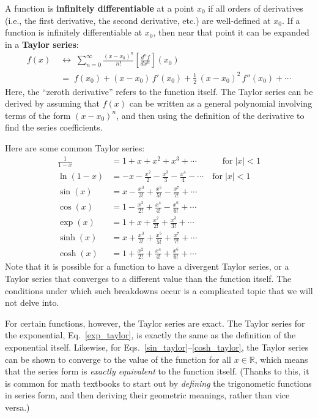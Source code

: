 \documentclass[10pt,a4paper]{article}
\begin{document}
A function is \textbf{infinitely differentiable} at a point $x_0$ if
all orders of derivatives (i.e., the first derivative, the second
derivative, etc.) are well-defined at $x_0$. If a function is
infinitely differentiable at $x_0$, then near that point it can be
expanded in a \textbf{Taylor series}:
\begin{align}
  f(x) \;&\leftrightarrow\; \sum_{n=0}^\infty \frac{(x-x_0)^n}{n!} \left[\frac{d^nf}{dx^n}\right](x_0) \\
  &=\; f(x_0) + (x-x_0)\, f'(x_0) + \frac{1}{2}\, (x-x_0)^2\, f''(x_0) + \cdots
\end{align}
Here, the ``zeroth derivative'' refers to the function itself. The
Taylor series can be derived by assuming that $f(x)$ can be written as
a general polynomial involving terms of the form $(x-x_0)^n$, and then
using the definition of the derivative to find the series
coefficients.

Here are some common Taylor series:
\begin{align}
  \frac{1}{1-x} &= 1 + x + x^2 + x^3 + \cdots
  \qquad\quad \mathrm{for} \; |x| < 1  \\
  \ln(1-x) &= -x - \frac{x^2}{2} - \frac{x^3}{3} - \frac{x^4}{4} - \cdots \quad \mathrm{for} \; |x| < 1 \\
  \sin(x) &= x - \frac{x^3}{3!} + \frac{x^5}{5!} - \frac{x^7}{7!} + \cdots
  \label{sin_taylor} \\
  \cos(x) &= 1 - \frac{x^2}{2!} + \frac{x^4}{4!} - \frac{x^6}{6!} + \cdots
  \label{cos_taylor} \\
  \exp(x) &= 1 + x + \frac{x^2}{2!} + \frac{x^3}{3!} + \cdots
  \label{exp_taylor} \\
  \sinh(x) &= x + \frac{x^3}{3!} + \frac{x^5}{5!} + \frac{x^7}{7!} + \cdots \\
  \cosh(x) &= 1 + \frac{x^2}{2!} + \frac{x^4}{4!} + \frac{x^6}{6!} + \cdots
  \label{cosh_taylor}
\end{align}
Note that it is possible for a function to have a divergent Taylor
series, or a Taylor series that converges to a different value than
the function itself. The conditions under which such breakdowns occur
is a complicated topic that we will not delve into.

For certain functions, however, the Taylor series are exact. The
Taylor series for the exponential, Eq.~\eqref{exp_taylor}, is exactly
the same as the definition of the exponential itself. Likewise, for
Eqs.~\eqref{sin_taylor}--\eqref{cosh_taylor}, the Taylor series can be
shown to converge to the value of the function for all
$x\in\mathbb{R}$, which means that the series form is \textit{exactly
  equivalent} to the function itself. (Thanks to this, it is common
for math textbooks to start out by \textit{defining} the trigonometic
functions in series form, and then deriving their geometric meanings,
rather than vice versa.)
\end{document}
